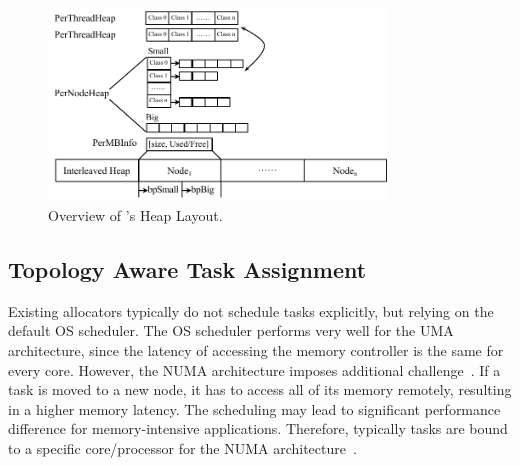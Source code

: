 \begin{figure}[h]
\begin{center}
\includegraphics[width=0.8\textwidth]{figure/heaplayout}
\end{center}
\vspace{-0.1in}
\caption{Overview of \NA{}'s Heap Layout.
\label{fig:overview}}
\vspace{-0.1in}
\end{figure}

\subsection{Topology Aware Task Assignment} 
\label{sec:taskassign}

Existing allocators typically do not schedule tasks explicitly, but relying on the default OS scheduler. The OS scheduler performs very well for the UMA architecture, since the latency of accessing the memory controller is the same for every core. However, the NUMA architecture imposes additional challenge~\cite{Majo:2015:LPC:2688500.2688509}. If a task is moved to a new node, it has to access all of its memory remotely, resulting in a higher memory latency. The scheduling may lead to significant performance difference for memory-intensive applications. Therefore, typically tasks are bound to a specific core/processor for the NUMA architecture~\cite{terboven2012assessing, terboven2012task, Majo:2015:LPC:2688500.2688509}.  

